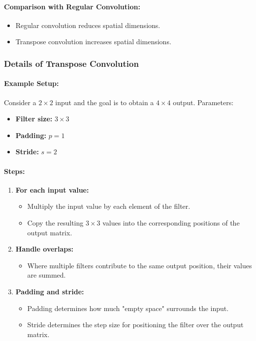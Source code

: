 \documentclass[letterpaper,12pt,notitlepage,twoside]{report}
\begin{document}
\paragraph{Comparison with Regular Convolution:}
\begin{itemize}
    \item Regular convolution reduces spatial dimensions.
    \item Transpose convolution increases spatial dimensions.
\end{itemize}

\subsubsection*{Details of Transpose Convolution}
\paragraph{Example Setup:} Consider a $2 \times 2$ input and the goal is to obtain a $4 \times 4$ output. Parameters:
\begin{itemize}[nosep]
    \item \textbf{Filter size:} $3 \times 3$
    \item \textbf{Padding:} $p = 1$
    \item \textbf{Stride:} $s = 2$
\end{itemize}

\paragraph{Steps:}
\begin{enumerate}
    \item \textbf{For each input value:}
    \begin{itemize}
        \item Multiply the input value by each element of the filter.
        \item Copy the resulting $3 \times 3$ values into the corresponding positions of the output matrix.
    \end{itemize}
    \item \textbf{Handle overlaps:}
    \begin{itemize}
        \item Where multiple filters contribute to the same output position, their values are summed.
    \end{itemize}
    \item \textbf{Padding and stride:}
    \begin{itemize}
        \item Padding determines how much "empty space" surrounds the input.
        \item Stride determines the step size for positioning the filter over the output matrix.
    \end{itemize}
\end{enumerate}
\end{document}
